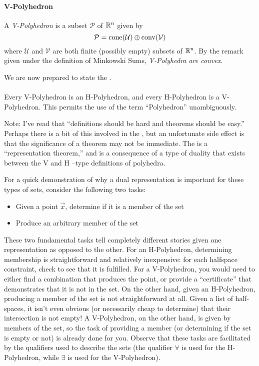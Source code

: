 \paragraph{V-Polyhedron}  A \textit{V-Polyhedron} is a subset $\mathcal{P}$ of $\mathbb{R}^n$ given by 
  \[ \mathcal{P} = \operatorname{cone}(\mathcal{U}) \oplus \operatorname{conv}(\mathcal{V}) \] 
where $\mathcal{U}$ and $\mathcal{V}$ are both finite (possibly empty) subsets of $\mathbb{R}^n$.  By the remark given under the definition of Minkowski Sums, \textit{V-Polyhedra are convex}.

\bigskip
\noindent We are now prepared to state the \MWT.

\paragraph{\MWT}
Every V-Polyhedron is an H-Polyhedron, and every H-Polyhedron is a V-Polyhedron.  This permits the use of the term ``Polyhedron'' unambiguously.
\medskip

Note:  I've read that ``definitions should be hard and theorems should be easy.''  Perhaps there is a bit of this involved in the \MWT{}, but an unfortunate side effect is that the significance of a theorem may not be immediate.  The \MWT{} is a ``representation theorem,'' and is a consequence of a type of duality that exists between the V and H --type definitions of polyhedra.

For a quick demonstration of why a dual representation is important for these types of sets, consider the following two tasks:
\begin{itemize}
  \item Given a point $\vec{x}$, determine if it is a member of the set
  \item Produce an arbitrary member of the set
\end{itemize}
These two fundamental tasks tell completely different stories given one representation as opposed to the other.  For an H-Polyhedron, determining membership is straightforward and relatively inexpensive: for each halfspace constraint, check to see that it is fulfilled.  For a V-Polyhedron, you would need to either find a combination that produces the point, or provide a ``certificate'' that demonstrates that it is not in the set.  On the other hand, given an H-Polyhedron, producing a member of the set is not straightforward at all.  Given a list of half-spaces, it isn't even obvious (or necessarily cheap to determine) that their intersection is not empty!  A V-Polyhedron, on the other hand, is given by members of the set, so the task of providing a member (or determining if the set is empty or not) is already done for you.  Observe that these tasks are facilitated by the qualifiers used to describe the sets (the qualifier $\forall$ is used for the H-Polyhedron, while $\exists$ is used for the V-Polyhedron).

